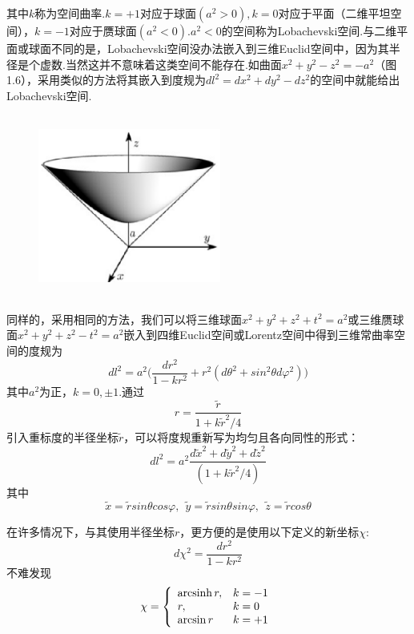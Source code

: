 \documentclass[a4paper]{book}
\begin{document}
其中$k$称为空间曲率.$k=+1$对应于球面$(a^2>0),$$k=0$对应于平面（二维平坦空间），$k=-1$对应于赝球面$(a^2<0)$.$a^2<0$的空间称为Lobachevski空间.与二维平面或球面不同的是，Lobachevski空间没办法嵌入到三维Euclid空间中，因为其半径是个虚数.当然这并不意味着这类空间不能存在.如曲面$x^2+y^2-z^2=-a^2$（图1.6），采用类似的方法将其嵌入到度规为$dl^2=dx^2+dy^2-dz^2$的空间中就能给出Lobachevski空间.
\begin{figure}[!h]
	\centering
	\includegraphics[width=6cm,height=6cm]{figures/双曲面.eps}
	\caption{}
\end{figure}\par 
同样的，采用相同的方法，我们可以将三维球面$x^2+y^2+z^2+t^2=a^2$或三维赝球面$x^2+y^2+z^2-t^2=a^2$嵌入到四维Euclid空间或Lorentz空间中得到三维常曲率空间的度规为
\begin{equation}\label{1.30}
	dl^2=a^2\Big(\frac{dr^2}{1-kr^2}+r^2(d\theta^2+sin^2\theta d\varphi^2)\Big)
\end{equation}
其中$a^2$为正，$k=0,\pm1$.通过
\begin{equation}
	r=\frac{\tilde{r}}{1+k\tilde{r}^2/4}
\end{equation}
引入重标度的半径坐标$\tilde{r}$，可以将度规重新写为均匀且各向同性的形式：
\begin{equation}\label{1.32}
	dl^2=a^2\frac{d\tilde{x}^2+d\tilde{y}^2+d\tilde{z}^2}{(1+k\tilde{r}^2/4)}
\end{equation}
其中
\begin{equation}
	\tilde{x}=\tilde{r}sin\theta cos\varphi,~~	\tilde{y}=\tilde{r}sin\theta sin\varphi,~~\tilde{z}=\tilde{r}cos\theta
\end{equation}\par 
在许多情况下，与其使用半径坐标$r$，更方便的是使用以下定义的新坐标$\chi$:
\begin{equation}
	d\chi^2=\frac{dr^2}{1-kr^2}
\end{equation}
不难发现
\begin{equation}
	\chi=\left\{\begin{array}{l l}{{\mathrm{arcsinh}\,r,}}&{{k=-1}}\\ {{r,}}&{{k=0}}\\ {{\mathrm{arcsin}\,r}}&{{k=+1}}\end{array}\right.

\end{equation}$$
\end{document}
